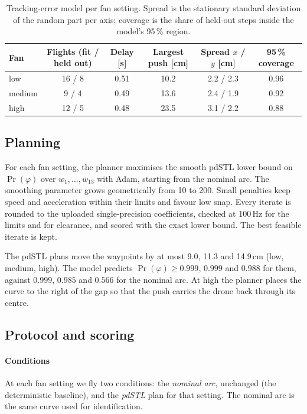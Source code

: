 \begin{table}[t]
  \centering
  \caption{Tracking-error model per fan setting. Spread is the stationary
  standard deviation of the random part per axis; coverage is the share of
  held-out steps inside the model's 95\,\% region.}
  \label{tab:hw-model}
  \begin{tabular}{lccccc}
    \toprule
    Fan & Flights (fit / held out) & Delay [s] & Largest push [cm] & Spread $x$ / $y$ [cm] & 95\,\% coverage \\
    \midrule
    low    & 16 / 8 & 0.51 & 10.2 & 2.2 / 2.3 & 0.96 \\
    medium &  9 / 4 & 0.49 & 13.6 & 2.4 / 1.9 & 0.92 \\
    high   & 12 / 5 & 0.48 & 23.5 & 3.1 / 2.2 & 0.88 \\
    \bottomrule
  \end{tabular}
\end{table}

\subsection{Planning}

For each fan setting, the planner maximises the smooth pdSTL lower bound
on $\Pr(\varphi)$ over $w_1, \dots, w_{13}$ with Adam, starting from the
nominal arc. The smoothing parameter grows geometrically from 10 to 200.
Small penalties keep speed and acceleration within their limits and favour
low snap. Every iterate is rounded to the uploaded single-precision
coefficients, checked at 100\,Hz for the limits and for clearance, and
scored with the exact lower bound. The best feasible iterate is kept.

The pdSTL plans move the waypoints by at most 9.0, 11.3 and 14.9\,cm (low,
medium, high). The model predicts $\Pr(\varphi) \ge 0.999$, $0.999$ and
$0.988$ for them, against $0.999$, $0.985$ and $0.566$ for the nominal
arc. At high the planner places the curve to the right of the gap so that
the push carries the drone back through its centre.

\subsection{Protocol and scoring}

\paragraph{Conditions}
At each fan setting we fly two conditions: the \emph{nominal arc},
unchanged (the deterministic baseline), and the \emph{pdSTL} plan for that
setting. The nominal arc is the same curve used for identification.

